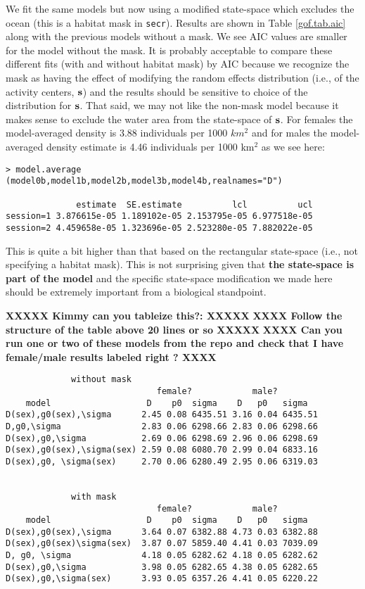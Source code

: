 We fit the same models but now using a modified state-space which
excludes the ocean (this is a habitat mask in \mbox{\tt secr}).
 Results are shown in Table \ref{gof.tab.aic} along with
the previous models without a mask.  We see AIC values are smaller for
the model without the mask. It is probably acceptable to compare these
different fits (with and without habitat mask) by AIC because we
recognize the mask as having the effect of modifying the random
effects distribution (i.e., of the activity centers, ${\bf s}$) and
the results should be sensitive to choice of the distribution for
${\bf s}$. That said, we may not like the non-mask model because it
makes sense to exclude the water area from the state-space of ${\bf
  s}$.  For females the model-averaged density is 3.88 individuals per
1000 $km^2$ and for males the model-averaged density estimate is 4.46
individuals per 1000 km$^2$ as we see here:
{\small
\begin{verbatim}
> model.average (model0b,model1b,model2b,model3b,model4b,realnames="D")

              estimate  SE.estimate          lcl          ucl
session=1 3.876615e-05 1.189102e-05 2.153795e-05 6.977518e-05
session=2 4.459658e-05 1.323696e-05 2.523280e-05 7.882022e-05
\end{verbatim}
}
This is quite a bit higher than that based on the rectangular state-space
(i.e., not specifying a habitat mask). This is not surprising given
that {\bf the state-space is part of the model} and the specific
state-space modification we made here should be extremely important
from a biological standpoint.

{\bf XXXXX Kimmy can you tableize this?: XXXXX}
{\bf XXXX Follow the structure of the table above 20 lines or so
  XXXXX}
{\bf XXXX Can you run one or two of these models from the repo and
  check that I have female/male results labeled right ? XXXX}
\begin{verbatim}
             without mask
                              female?            male?
    model                   D    p0  sigma    D   p0   sigma
D(sex),g0(sex),\sigma      2.45 0.08 6435.51 3.16 0.04 6435.51
D,g0,\sigma                2.83 0.06 6298.66 2.83 0.06 6298.66
D(sex),g0,\sigma           2.69 0.06 6298.69 2.96 0.06 6298.69
D(sex),g0(sex),\sigma(sex) 2.59 0.08 6080.70 2.99 0.04 6833.16
D(sex),g0, \sigma(sex)     2.70 0.06 6280.49 2.95 0.06 6319.03


             with mask
                              female?            male?
    model                   D    p0  sigma    D   p0   sigma
D(sex),g0(sex),\sigma      3.64 0.07 6382.88 4.73 0.03 6382.88
D(sex),g0(sex)\sigma(sex)  3.87 0.07 5859.40 4.41 0.03 7039.09
D, g0, \sigma              4.18 0.05 6282.62 4.18 0.05 6282.62
D(sex),g0,\sigma           3.98 0.05 6282.65 4.38 0.05 6282.65
D(sex),g0,\sigma(sex)      3.93 0.05 6357.26 4.41 0.05 6220.22
\end{verbatim}





